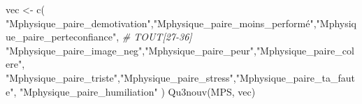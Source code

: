 \documentclass[
]{article}
\newenvironment{Shaded}{\begin{snugshade}}{\end{snugshade}}
\newcommand{\CommentTok}[1]{\textcolor[rgb]{0.56,0.35,0.01}{\textit{#1}}}
\newcommand{\FunctionTok}[1]{\textcolor[rgb]{0.00,0.00,0.00}{#1}}
\newcommand{\NormalTok}[1]{#1}
\newcommand{\OtherTok}[1]{\textcolor[rgb]{0.56,0.35,0.01}{#1}}
\newcommand{\StringTok}[1]{\textcolor[rgb]{0.31,0.60,0.02}{#1}}
\begin{document}
\begin{Shaded}
\begin{Highlighting}[]
\NormalTok{vec }\OtherTok{\textless{}{-}} \FunctionTok{c}\NormalTok{(}
    \StringTok{"Mphysique\_paire\_demotivation"}\NormalTok{,}\StringTok{"Mphysique\_paire\_moins\_performé"}\NormalTok{,}\StringTok{"Mphysique\_paire\_perteconfiance"}\NormalTok{,   }\CommentTok{\# TOUT[27{-}36]}
    \StringTok{"Mphysique\_paire\_image\_neg"}\NormalTok{,}\StringTok{"Mphysique\_paire\_peur"}\NormalTok{,}\StringTok{"Mphysique\_paire\_colere"}\NormalTok{,}
     \StringTok{"Mphysique\_paire\_triste"}\NormalTok{,}\StringTok{"Mphysique\_paire\_stress"}\NormalTok{,}\StringTok{"Mphysique\_paire\_ta\_faute"}\NormalTok{,}
     \StringTok{"Mphysique\_paire\_humiliation"}  
\NormalTok{     )}
\FunctionTok{Qu3nouv}\NormalTok{(MPS, vec)}
\end{Highlighting}
\end{Shaded}
\end{document}
